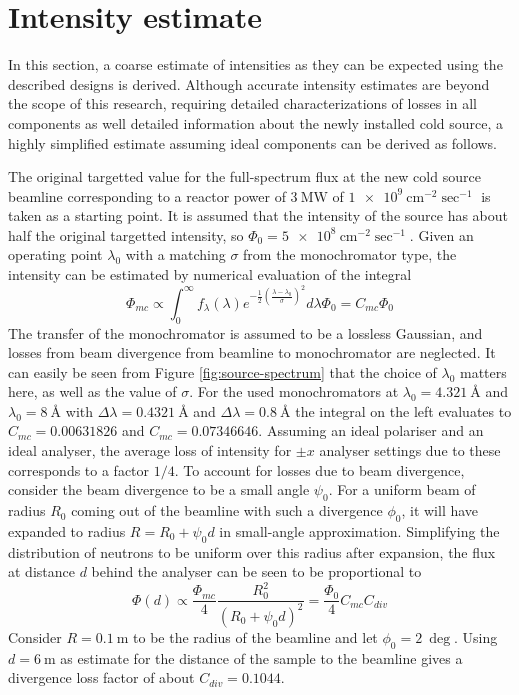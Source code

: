 \section{Intensity estimate}
\label{c4.3}
In this section, a coarse estimate of intensities as they can be expected using the described designs is derived. Although accurate intensity estimates are beyond the scope of this research, requiring detailed characterizations of losses in all components as well detailed information about the newly installed cold source, a highly simplified estimate assuming ideal components can be derived as follows.

The original targetted value for the full-spectrum flux at the new cold source beamline corresponding to a reactor power of $\SI{3}{\mega\watt}$ of $\SI{1e9}{\centi\meter^{-2}\sec^{-1}}$ \cite{OYSTER2008} is taken as a starting point. It is assumed that the intensity of the source has about half the original targetted intensity, so $\Phi_0 = \SI{5e8}{\centi\meter^{-2}\sec^{-1}}$. Given an operating point $\lambda_0$ with a matching $\sigma$ from the monochromator type, the intensity can be estimated by numerical evaluation of the integral
$$\Phi_{mc} \propto \int_0^\infty f_\lambda(\lambda)e^{-\frac{1}{2}\left(\frac{\lambda - \lambda_0}{\sigma}\right)^2}d\lambda \Phi_0= C_{mc}\Phi_0$$
The transfer of the monochromator is assumed to be a lossless Gaussian, and losses from beam divergence from beamline to monochromator are neglected.  It can easily be seen from Figure \ref{fig:source-spectrum} that the choice of $\lambda_0$ matters here, as well as the value of $\sigma$. For the used monochromators at $\lambda_0 = \SI{4.321}{\angstrom}$ and $\lambda_0 = \SI{8}{\angstrom}$ with $\Delta\lambda = \SI{0.4321}{\angstrom}$ and $\Delta\lambda = \SI{0.8}{\angstrom}$ the integral on the left evaluates to $C_{mc} = 0.00631826$ and $C_{mc} = 0.07346646$. Assuming an ideal polariser and an ideal analyser, the average loss of intensity for $\pm x$ analyser settings due to these corresponds to a factor $1/4$. To account for losses due to beam divergence, consider the beam divergence to be a small angle $\psi_0$. 
For a uniform beam of radius $R_0$ coming out of the beamline with such a divergence $\phi_0$, it will have expanded to radius $R = R_0 + \psi_0 d$ in small-angle approximation. Simplifying the distribution of neutrons to be uniform over this radius after expansion, the flux at distance $d$ behind the analyser can be seen to be proportional to
$$\Phi(d) \propto \frac{\Phi_{mc}}{4}\frac{R_0^2}{(R_0 + \psi_0 d)^2} = \frac{\Phi_0}{4}C_{mc}C_{div}$$
Consider $R = \SI{0.1}{\meter}$ to be the radius of the beamline and let $\phi_0 = \SI{2}{\deg}$. Using $d = \SI{6}{\meter}$ as estimate for the distance of the sample to the beamline gives a divergence loss factor of about $C_{div} = 0.1044$.

